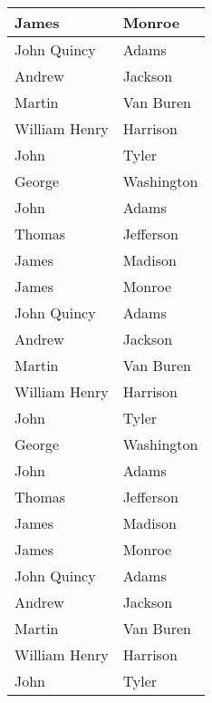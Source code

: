 \documentclass{article}
\begin{document}
\begin{supertabular}{|l|l|}
\\ \hline James & Monroe
\\ \hline John Quincy & Adams
\\ \hline Andrew & Jackson
\\ \hline Martin & Van Buren
\\ \hline William Henry & Harrison
\\ \hline John & Tyler
\\ \hline George & Washington
\\ \hline John & Adams
\\ \hline Thomas & Jefferson
\\ \hline James & Madison
\\ \hline James & Monroe
\\ \hline John Quincy & Adams
\\ \hline Andrew & Jackson
\\ \hline Martin & Van Buren
\\ \hline William Henry & Harrison
\\ \hline John & Tyler
\\ \hline George & Washington
\\ \hline John & Adams
\\ \hline Thomas & Jefferson
\\ \hline James & Madison
\\ \hline James & Monroe
\\ \hline John Quincy & Adams
\\ \hline Andrew & Jackson
\\ \hline Martin & Van Buren
\\ \hline William Henry & Harrison
\\ \hline John & Tyler
\\ \hline
\end{supertabular}
\end{document}
